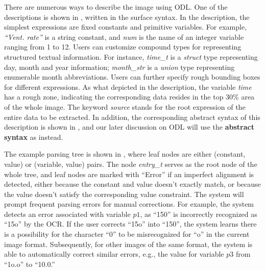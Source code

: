 There are numerous ways to describe the image using ODL.
One of the descriptions is shown in ,
written in the surface syntax.
In the description,
the simplest expressions are fixed constants and primitive variables.
For example, \textit{``Vent. rate''} is a string constant,
and \textit{num} is the name of an integer variable ranging from 1 to 12.
Users can customize compound types
for representing structured textual information.
For instance, \textit{time\_t} is a \textit{struct} type representing
day, month and year information;
\textit{month\_str} is a \textit{union} type representing enumerable month abbreviations.
Users can further specify rough bounding boxes for different expressions.
As what depicted in the description,
the variable \textit{time} has a rough zone, indicating
the corresponding data resides in the top 30\% area of the whole image.
The keyword \textit{source} stands for the root expression
of the entire data to be extracted.
In addition, the corresponding abstract syntax of this description is shown in ,
and our later discussion on ODL will use the \textbf{abstract syntax} as instead.



The example parsing tree is shown in ,
where leaf nodes are either (constant, value) or (variable, value) pairs.
The node \textit{entry\_t} serves as the root node of the whole tree,
and leaf nodes are marked with ``Error'' if an imperfect alignment is detected,
either because the constant and value doesn't exactly match,
or because the value doesn't satisfy the corresponding value constraint.
The system will prompt frequent parsing errors for manual corrections.
For example, the system detects an error associated with variable $p1$,
as ``150'' is incorrectly recognized as ``15o'' by the OCR.
If the user corrects ``15o'' into ``150'',
the system learns there is a possibility for the character ``0''
to be misrecognized for ``o'' in the current image format.
Subsequently, for other images of the same format,
the system is able to automatically correct similar errors, e.g.,
the value for variable $p3$ from ``1o.o'' to ``10.0.''


